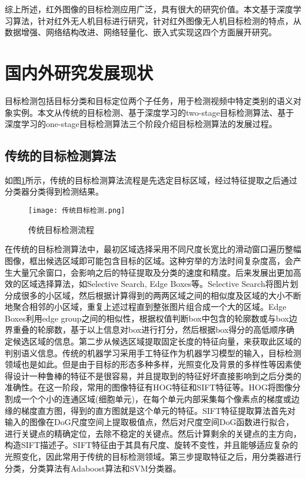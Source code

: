 综上所述，红外图像的目标检测应用广泛，具有很大的研究价值。本文基于深度学习算法，针对红外无人机目标进行研究，针对红外图像无人机目标检测的特点，从数据增强、网络结构改进、网络轻量化、嵌入式实现这四个方面展开研究。

\section{国内外研究发展现状}
目标检测包括目标分类和目标定位两个子任务，用于检测视频中特定类别的语义对象实例。本文从传统的目标检测、基于深度学习的two-stage目标检测算法、基于深度学习的one-stage目标检测算法三个阶段介绍目标检测算法的发展过程\cite{尹宏鹏2016基于视觉的目标检测与跟踪综述}。

\subsection{传统的目标检测算法}
如图\ref{ct}所示，传统的目标检测算法流程是先选定目标区域，经过特征提取之后通过分类器分类得到检测结果。

\begin{figure}[htbp]
    \centering
    \texttt{[image: 传统目标检测.png]}
    \caption{传统目标检测流程}
    \label{ct}
\end{figure}

在传统的目标检测算法中，最初区域选择采用不同尺度长宽比的滑动窗口遍历整幅图像，框出候选区域即可能包含目标的区域\cite{胡伏原2020基于卷积神经网络的目标检测算法综述,kira1992feature}。这种穷举的方法时间复杂度高，会产生大量冗余窗口，会影响之后的特征提取及分类的速度和精度。后来发展出更加高效的区域选择算法，如Selective Search\cite{uijlings2013selective},  Edge Boxes\cite{zitnick2014edge}等。Selective Search将图片划分成很多的小区域，然后根据计算得到的两两区域之间的相似度及区域的大小不断地聚合相邻的小区域，重复上述过程直到整张图片组合成一个大的区域。Edge Boxes利用edge group之间的相似性，根据权值判断box中包含的轮廓数或与box边界重叠的轮廓数，基于以上信息对box进行打分，然后根据box得分的高低顺序确定候选区域的信息。第二步从候选区域提取固定长度的特征向量，来获取此区域的判别语义信息。传统的机器学习采用手工特征作为机器学习模型的输入，目标检测领域也是如此。但是由于目标的形态多种多样，光照变化及背景的多样性等因素使得设计一种鲁棒的特征不是很容易，并且提取到的特征好坏直接影响到之后分类的准确性。在这一阶段，常用的图像特征有HOG特征\cite{he1990texture}和SIFT特征\cite{lowe1999object}等。HOG将图像分割成一个个小的连通区域(细胞单元)，在每个单元内部采集每个像素点的梯度或边缘的梯度直方图，得到的直方图就是这个单元的特征。SIFT特征提取算法首先对输入的图像在DoG尺度空间上提取极值点，然后对尺度空间DoG函数进行拟合，进行关键点的精确定位，去除不稳定的关键点。然后计算剩余的关键点的主方向，构造SIFT描述子。SIFT特征由于其具有尺度、旋转不变性，并且能够适应复杂的光照变化，因此常用于传统的目标检测领域。第三步提取特征之后，用分类器进行分类，分类算法有Adaboost算法\cite{freund1997decision}和SVM分类器\cite{cortes1995support}。

